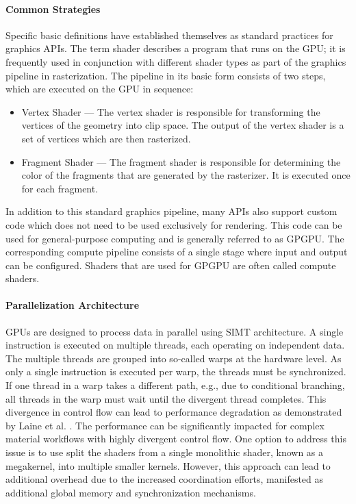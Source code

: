 \paragraph{Common Strategies}
\label{sec:commonGpuStrategies}

Specific basic definitions have established themselves as standard practices for graphics \glspl{API}. The term shader describes a program that runs on the \gls{GPU}; it is frequently used in conjunction with different shader types as part of the graphics pipeline in rasterization. The pipeline in its basic form consists of two steps, which are executed on the \gls{GPU} in sequence:

\begin{itemize}
  \item{Vertex Shader} — The vertex shader is responsible for transforming the vertices of the geometry into clip space. The output of the vertex shader is a set of vertices which are then rasterized.
  \item{Fragment Shader} — The fragment shader is responsible for determining the color of the fragments that are generated by the rasterizer. It is executed once for each fragment.
\end{itemize}

In addition to this standard graphics pipeline, many \glspl{API} also support custom code which does not need to be used exclusively for rendering. This code can be used for general-purpose computing and is generally referred to as \gls{GPGPU}. The corresponding compute pipeline consists of a single stage where input and output can be configured. Shaders that are used for \gls{GPGPU} are often called compute shaders.

\paragraph{Parallelization Architecture}
\label{sec:parallelization-architecture}

\glspl{GPU} are designed to process data in parallel using \gls{SIMT} architecture. A single instruction is executed on multiple threads, each operating on independent data. The multiple threads are grouped into so-called warps at the hardware level. As only a single instruction is executed per warp, the threads must be synchronized. If one thread in a warp takes a different path, e.g., due to conditional branching, all threads in the warp must wait until the divergent thread completes. This divergence in control flow can lead to performance degradation as demonstrated by Laine et al. \cite{laine2013megakernels}. The performance can be significantly impacted for complex material workflows with highly divergent control flow. One option to address this issue is to use split the shaders from a single monolithic shader, known as a megakernel, into multiple smaller kernels. However, this approach can lead to additional overhead due to the increased coordination efforts, manifested as additional global memory and synchronization mechanisms.

